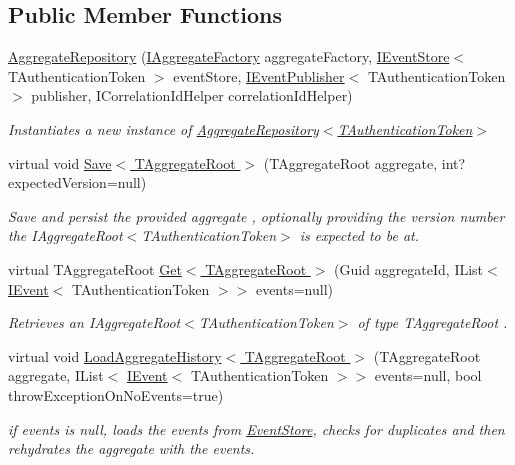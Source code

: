 \subsection*{Public Member Functions}
\begin{DoxyCompactItemize}
\item 
\hyperlink{classCqrs_1_1Domain_1_1AggregateRepository_ae4a6c96b10c536a0df6a381659f87744_ae4a6c96b10c536a0df6a381659f87744}{Aggregate\+Repository} (\hyperlink{interfaceCqrs_1_1Domain_1_1Factories_1_1IAggregateFactory}{I\+Aggregate\+Factory} aggregate\+Factory, \hyperlink{interfaceCqrs_1_1Events_1_1IEventStore}{I\+Event\+Store}$<$ T\+Authentication\+Token $>$ event\+Store, \hyperlink{interfaceCqrs_1_1Events_1_1IEventPublisher}{I\+Event\+Publisher}$<$ T\+Authentication\+Token $>$ publisher, I\+Correlation\+Id\+Helper correlation\+Id\+Helper)
\begin{DoxyCompactList}\small\item\em Instantiates a new instance of \hyperlink{classCqrs_1_1Domain_1_1AggregateRepository_ae4a6c96b10c536a0df6a381659f87744_ae4a6c96b10c536a0df6a381659f87744}{Aggregate\+Repository$<$\+T\+Authentication\+Token$>$} \end{DoxyCompactList}\item 
virtual void \hyperlink{classCqrs_1_1Domain_1_1AggregateRepository_aff9e828d19a091a4275f635bee4b3c9b_aff9e828d19a091a4275f635bee4b3c9b}{Save$<$ T\+Aggregate\+Root $>$} (T\+Aggregate\+Root aggregate, int? expected\+Version=null)
\begin{DoxyCompactList}\small\item\em Save and persist the provided {\itshape aggregate} , optionally providing the version number the I\+Aggregate\+Root$<$\+T\+Authentication\+Token$>$ is expected to be at. \end{DoxyCompactList}\item 
virtual T\+Aggregate\+Root \hyperlink{classCqrs_1_1Domain_1_1AggregateRepository_a0e55881812d463129df34189d29544b6_a0e55881812d463129df34189d29544b6}{Get$<$ T\+Aggregate\+Root $>$} (Guid aggregate\+Id, I\+List$<$ \hyperlink{interfaceCqrs_1_1Events_1_1IEvent}{I\+Event}$<$ T\+Authentication\+Token $>$$>$ events=null)
\begin{DoxyCompactList}\small\item\em Retrieves an I\+Aggregate\+Root$<$\+T\+Authentication\+Token$>$ of type {\itshape T\+Aggregate\+Root} . \end{DoxyCompactList}\item 
virtual void \hyperlink{classCqrs_1_1Domain_1_1AggregateRepository_af26efcb464ac989962a9ad138466e4d7_af26efcb464ac989962a9ad138466e4d7}{Load\+Aggregate\+History$<$ T\+Aggregate\+Root $>$} (T\+Aggregate\+Root aggregate, I\+List$<$ \hyperlink{interfaceCqrs_1_1Events_1_1IEvent}{I\+Event}$<$ T\+Authentication\+Token $>$$>$ events=null, bool throw\+Exception\+On\+No\+Events=true)
\begin{DoxyCompactList}\small\item\em if {\itshape events}  is null, loads the events from \hyperlink{namespaceCqrs_1_1EventStore}{Event\+Store}, checks for duplicates and then rehydrates the {\itshape aggregate}  with the events. \end{DoxyCompactList}\end{DoxyCompactItemize}
